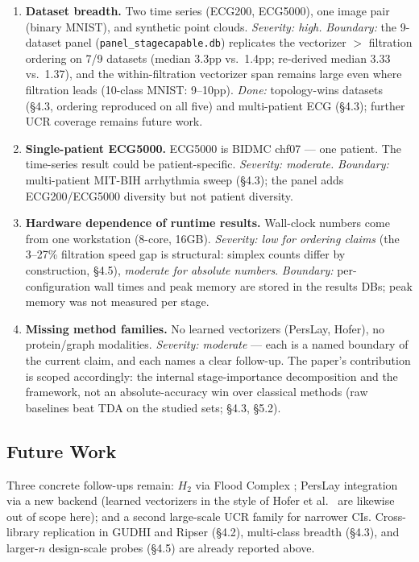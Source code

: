 \documentclass[12pt, a4paper]{report}
\theoremstyle{definition}
\theoremstyle{plain}
\theoremstyle{remark}
\begin{document}
\begin{enumerate}
  \item \textbf{Dataset breadth.} Two time series (ECG200, ECG5000), one
    image pair (binary MNIST), and synthetic point clouds. \emph{Severity:
    high.} \emph{Boundary:} the 9-dataset panel
    (\texttt{panel\_stagecapable.db}) replicates the vectorizer $>$
    filtration ordering on 7/9 datasets (median 3.3pp vs.\ 1.4pp;
    re-derived median 3.33 vs.\ 1.37), and the within-filtration
    vectorizer span remains large even where filtration leads (10-class
    MNIST: 9--10pp). \emph{Done:} topology-wins datasets (\S4.3, ordering
    reproduced on all five) and multi-patient ECG (\S4.3); further UCR coverage remains future work.
  \item \textbf{Single-patient ECG5000.} ECG5000 is BIDMC chf07 --- one
    patient. The time-series result could be patient-specific.
    \emph{Severity: moderate.} \emph{Boundary:} multi-patient
    MIT-BIH arrhythmia sweep (\S4.3); the panel adds ECG200/ECG5000 diversity but
    not patient diversity.
  \item \textbf{Hardware dependence of runtime results.} Wall-clock
    numbers come from one workstation (8-core, 16GB). \emph{Severity: low
    for ordering claims} (the 3--27\% filtration speed gap is structural:
    simplex counts differ by construction, \S4.5), \emph{moderate for
    absolute numbers}. \emph{Boundary:} per-configuration wall times and
    peak memory are stored in the results DBs; peak memory was not
    measured per stage.
  \item \textbf{Missing method families.} No learned vectorizers
    (PersLay, Hofer), no protein/graph modalities. \emph{Severity:
    moderate} --- each is a named boundary of the current claim, and each
    names a clear follow-up. The paper's contribution is scoped
    accordingly: the internal stage-importance decomposition and the
    framework, not an absolute-accuracy win over classical methods (raw
    baselines beat TDA on the studied sets; \S4.3, \S5.2).
\end{enumerate}

\subsection{Future Work}

Three concrete follow-ups remain: $H_2$ via Flood Complex
\cite{graf2025}; PersLay integration \cite{carriere2020} via a new
backend (learned vectorizers in the style of Hofer et al.\
\cite{hofer2017} are likewise out of scope here); and a second
large-scale UCR family for narrower CIs. Cross-library replication in
GUDHI and Ripser (\S4.2), multi-class breadth (\S4.3), and
larger-$n$ design-scale probes (\S4.5) are already reported above.
\end{document}
